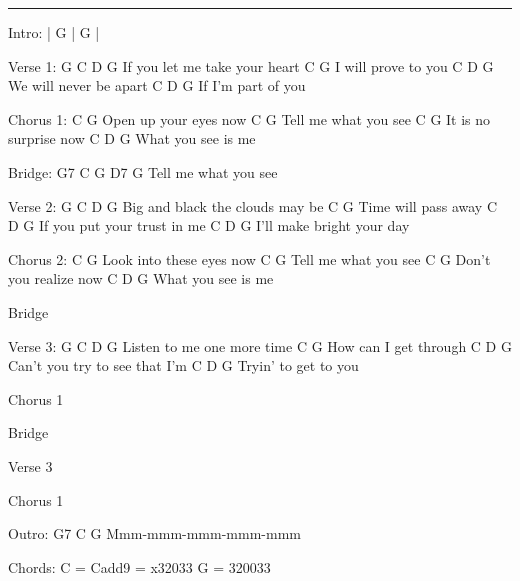 \noindent\rule{\columnwidth}{1pt}

\begin{multicols}{2}
\begin{lstsong}
Intro: | G | G |         

Verse 1:
G      C      D         G
If you let me take your heart    
       C        G
I will prove to you
        C     D   G   
We will never be apart    
C      D       G
If I'm part of you

Chorus 1:
C            G
Open up your eyes now
C                G
Tell me what you see
C           G                
It is no surprise now
C         D     G
What you see is me

Bridge:
G7                 C    G  D7 G  
Tell me what you see

Verse 2:
G       C         D          G
Big and black the clouds may be  
          C     G
Time will pass away
       C        D        G   
If you put your trust in me  
C         D           G
I'll make bright your day



Chorus 2:
C               G
Look into these eyes now
C                G
Tell me what you see
C            G                
Don't you realize now
C        D      G
What you see is me

Bridge

Verse 3:
G      C     D        G
Listen to me one more time  
        C     G
How can I get through
          C      D        G   
Can't you try to see that I'm   
C         D      G
Tryin' to get to you

Chorus 1

Bridge

Verse 3

Chorus 1

Outro:
G7                            C     G
Mmm-mmm-mmm-mmm-mmm

Chords:
C = Cadd9 = x32033
G = 320033
\end{lstsong}
\end{multicols}
\newpage

